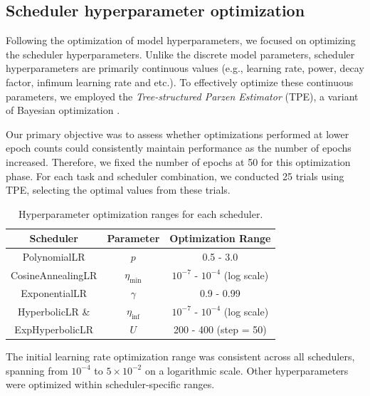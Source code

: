 \documentclass{article}
\theoremstyle{plain}
\theoremstyle{definition}
\theoremstyle{remark}
\begin{document}
\subsection{Scheduler hyperparameter optimization}

Following the optimization of model hyperparameters, we focused on optimizing the scheduler hyperparameters.
Unlike the discrete model parameters, scheduler hyperparameters are primarily continuous values (e.g., learning rate, power, decay factor, infimum learning rate and etc.).
To effectively optimize these continuous parameters, we employed the \textit{Tree-structured Parzen Estimator} (TPE), a variant of Bayesian optimization \cite{bergstra2011algorithms,watanabe2023tree}.

Our primary objective was to assess whether optimizations performed at lower epoch counts could consistently maintain performance as the number of epochs increased.
Therefore, we fixed the number of epochs at 50 for this optimization phase.
For each task and scheduler combination, we conducted 25 trials using TPE, selecting the optimal values from these trials.
\begin{table}[h]
\caption{Hyperparameter optimization ranges for each scheduler.}
\label{tab:scheduler_ranges}
\vskip 0.1in
\begin{center}
\begin{small}
\begin{sc}
\begin{tabular}{ccc}
\toprule
\textbf{Scheduler} & \textbf{Parameter} & \textbf{Optimization Range} \\
\midrule
PolynomialLR & $p$ & 0.5 - 3.0 \\ 
\midrule
CosineAnnealingLR & $\eta_\text{min}$ & $10^{-7}$ - $10^{-4}$ (log scale) \\
\midrule
ExponentialLR & $\gamma$ & 0.9 - 0.99 \\
\midrule
HyperbolicLR \& & $\eta_\text{inf}$ & $10^{-7}$ - $10^{-4}$ (log scale) \\
ExpHyperbolicLR & $U$ & 200 - 400 (step = 50) \\
\bottomrule
\end{tabular}
\end{sc}
\end{small}
\end{center}
\end{table}
The initial learning rate optimization range was consistent across all schedulers, spanning from $10^{-4}$ to $5 \times 10^{-2}$ on a logarithmic scale.
Other hyperparameters were optimized within scheduler-specific ranges.
\end{document}
